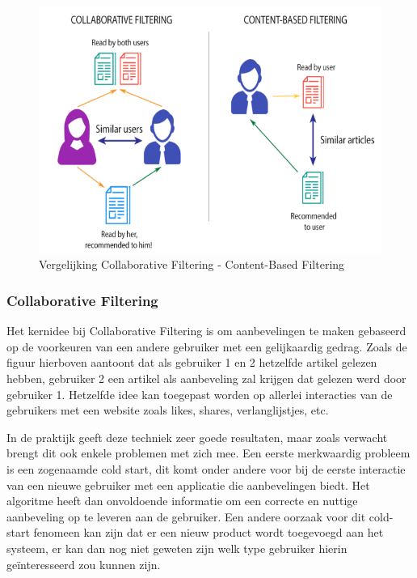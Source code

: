 \begin{figure} [h!]
	\centering
	\includegraphics[width=\linewidth]{img/Content-based-filtering-and-Collaborative-filtering-recommendation}
	\caption[Vergelijking Collaborative Filtering - Content-Based Filtering]{Vergelijking Collaborative Filtering - Content-Based Filtering}
	\label{fig:CollaborativeVsContentBased}
\end{figure}

	
\subsubsection{Collaborative Filtering}
\label{sec:Collaborative Filtering}

Het kernidee bij Collaborative Filtering \autocite{Schafera} is om aanbevelingen te maken gebaseerd op de voorkeuren van een andere gebruiker met een gelijkaardig gedrag. Zoals de figuur hierboven aantoont dat als gebruiker 1 en 2 hetzelfde artikel gelezen hebben, gebruiker 2 een artikel als aanbeveling zal krijgen dat gelezen werd door gebruiker 1. 
Hetzelfde idee kan toegepast worden op allerlei interacties van de gebruikers met een website zoals likes, shares, verlanglijstjes, etc.

In de praktijk geeft deze techniek zeer goede resultaten, maar zoals verwacht brengt dit ook enkele problemen met zich mee. Een eerste merkwaardig probleem is een zogenaamde cold start, dit komt onder andere voor bij de eerste interactie van een nieuwe gebruiker met een applicatie die aanbevelingen biedt. Het algoritme heeft dan onvoldoende informatie om een correcte en nuttige aanbeveling op te leveren aan de gebruiker. Een andere oorzaak voor dit cold-start fenomeen kan zijn dat er een nieuw product wordt toegevoegd aan het systeem, er kan dan nog niet geweten zijn welk type gebruiker hierin geïnteresseerd zou kunnen zijn. 

